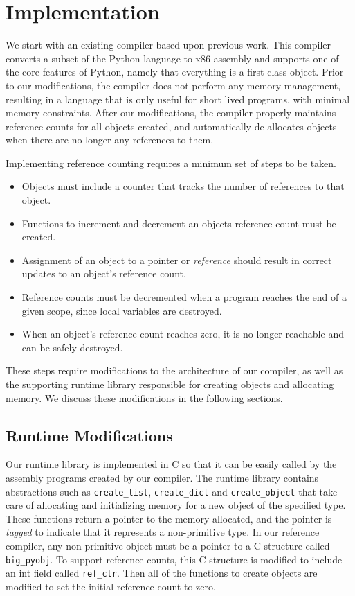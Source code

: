 \documentclass{sigplanconf}
\begin{document}
\section{Implementation}
\label{sec:implementation}

We start with an existing compiler based upon previous work\cite{siek}.  This compiler converts a subset of the Python language to x86 assembly and supports one of the core features of Python, namely that everything is a first class object.  Prior to our modifications, the compiler does not perform any memory management, resulting in a language that is only useful for short lived programs, with minimal memory constraints.  After our modifications, the compiler properly maintains reference counts for all objects created, and automatically de-allocates objects when there are no longer any references to them.

Implementing reference counting requires a minimum set of steps to be taken.

\begin{itemize}
\item Objects must include a counter that tracks the number of references to that object.
\item Functions to increment and decrement an objects reference count must be created.
\item Assignment of an object to a pointer or \textit{reference} should result in correct updates to an object's reference count.
\item Reference counts must be decremented when a program reaches the end of a given scope, since local variables are destroyed.
\item When an object's reference count reaches zero, it is no longer reachable and can be safely destroyed.

\end{itemize}

These steps require modifications to the architecture of our compiler, as well as the supporting runtime library responsible for creating objects and allocating memory.  We discuss these modifications in the following sections.

\subsection{Runtime Modifications}
Our runtime library is implemented in C so that it can be easily called by the assembly programs created by our compiler.  The runtime library contains abstractions such as \texttt{create\_list}, \texttt{create\_dict} and \texttt{create\_object} that take care of allocating and initializing memory for a new object of the specified type.  These functions return a pointer to the memory allocated, and the pointer is \textit{tagged} to indicate that it represents a non-primitive type.  In our reference compiler, any non-primitive object must be a pointer to a C structure called \texttt{big\_pyobj}.  To support reference counts, this C structure is modified to include an int field called \texttt{ref\_ctr}.  Then all of the functions to create objects are modified to set the initial reference count to zero.
\end{document}
